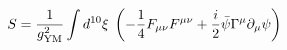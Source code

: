 \begin{equation}
S = \frac{1}{g_{{\rm YM}}^2}  \int d^{10}\xi \; \left(
 -\frac{1}{4} F_{\mu \nu}F^{\mu \nu}
+ \frac{i}{2}  \bar{\psi} \Gamma^\mu \partial_{\mu} \psi \right)
\label{eq:SYM1}
\end{equation}

